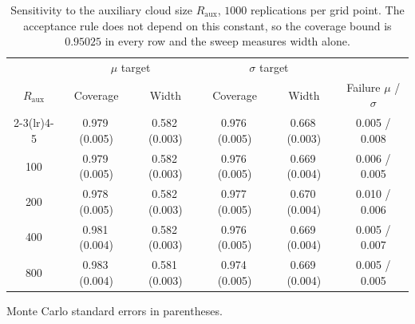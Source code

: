 \begin{table}[!htbp]
\centering
\caption{Sensitivity to the auxiliary cloud size $R_{\mathrm{aux}}$, $1000$ replications per grid point. The acceptance rule does not depend on this constant, so the coverage bound is $0.95025$ in every row and the sweep measures width alone.}
\label{tab:sens-R_aux}
\small
\begin{tabular}{cccccc}
\toprule
& \multicolumn{2}{c}{$\mu$ target} & \multicolumn{2}{c}{$\sigma$ target} & \\
$R_{\mathrm{aux}}$ & Coverage & Width & Coverage & Width & Failure $\mu$ / $\sigma$ \\
\cmidrule(lr){2-3}\cmidrule(lr){4-5}
\midrule
50 & 0.979\,(0.005) & 0.582\,(0.003) & 0.976\,(0.005) & 0.668\,(0.003) & 0.005 / 0.008 \\
100 & 0.979\,(0.005) & 0.582\,(0.003) & 0.976\,(0.005) & 0.669\,(0.004) & 0.006 / 0.005 \\
200 & 0.978\,(0.005) & 0.582\,(0.003) & 0.977\,(0.005) & 0.670\,(0.004) & 0.010 / 0.006 \\
400 & 0.981\,(0.004) & 0.582\,(0.003) & 0.976\,(0.005) & 0.669\,(0.004) & 0.005 / 0.007 \\
800 & 0.983\,(0.004) & 0.581\,(0.003) & 0.974\,(0.005) & 0.669\,(0.004) & 0.005 / 0.005 \\
\bottomrule
\end{tabular}

\vspace{2pt}
\begin{minipage}{.94\linewidth}\footnotesize
Monte Carlo standard errors in parentheses.
\end{minipage}
\end{table}
